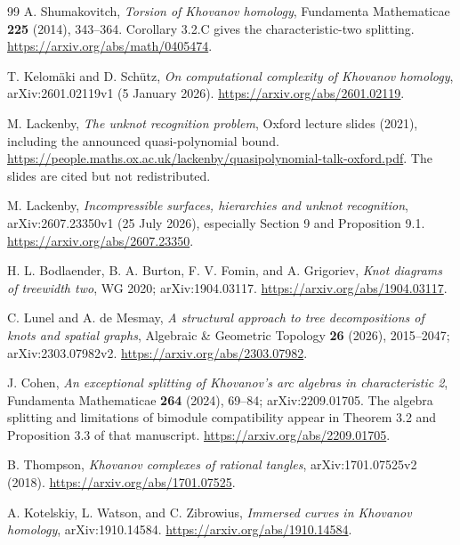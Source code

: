 \begin{thebibliography}{99}
A. Shumakovitch, \emph{Torsion of Khovanov homology},
Fundamenta Mathematicae \textbf{225} (2014), 343--364.
Corollary 3.2.C gives the characteristic-two splitting.
\url{https://arxiv.org/abs/math/0405474}.

T. Kelom\"aki and D. Sch\"utz,
\emph{On computational complexity of Khovanov homology},
arXiv:2601.02119v1 (5 January 2026).
\url{https://arxiv.org/abs/2601.02119}.

M. Lackenby, \emph{The unknot recognition problem},
Oxford lecture slides (2021), including the announced quasi-polynomial bound.
\url{https://people.maths.ox.ac.uk/lackenby/quasipolynomial-talk-oxford.pdf}.
The slides are cited but not redistributed.

M. Lackenby, \emph{Incompressible surfaces, hierarchies and unknot recognition},
arXiv:2607.23350v1 (25 July 2026), especially Section 9 and Proposition 9.1.
\url{https://arxiv.org/abs/2607.23350}.

H. L. Bodlaender, B. A. Burton, F. V. Fomin, and A. Grigoriev,
\emph{Knot diagrams of treewidth two}, WG 2020;
arXiv:1904.03117.
\url{https://arxiv.org/abs/1904.03117}.

C. Lunel and A. de Mesmay,
\emph{A structural approach to tree decompositions of knots and spatial graphs},
Algebraic \& Geometric Topology \textbf{26} (2026), 2015--2047;
arXiv:2303.07982v2.
\url{https://arxiv.org/abs/2303.07982}.

J. Cohen, \emph{An exceptional splitting of Khovanov's arc algebras in
characteristic 2}, Fundamenta Mathematicae \textbf{264} (2024), 69--84;
arXiv:2209.01705. The algebra splitting and limitations of bimodule
compatibility appear in Theorem 3.2 and
Proposition 3.3 of that manuscript.
\url{https://arxiv.org/abs/2209.01705}.

B. Thompson, \emph{Khovanov complexes of rational tangles},
arXiv:1701.07525v2 (2018).
\url{https://arxiv.org/abs/1701.07525}.

A. Kotelskiy, L. Watson, and C. Zibrowius,
\emph{Immersed curves in Khovanov homology},
arXiv:1910.14584.
\url{https://arxiv.org/abs/1910.14584}.
\end{thebibliography}
